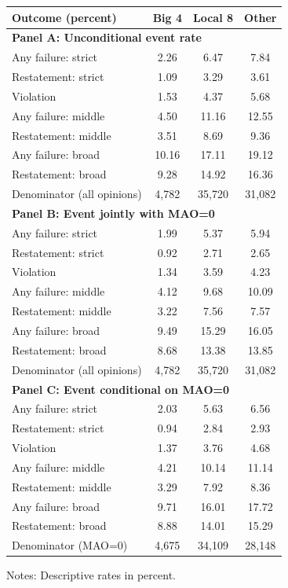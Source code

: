 \documentclass[10pt]{article}
\begin{document}
\begin{minipage}{19cm}\fontsize{10}{12}\selectfont\centering
\setlength{\tabcolsep}{4pt}\renewcommand{\arraystretch}{1.15}
\begin{tabular}{lccc}\toprule
Outcome (percent) & Big 4 & Local 8 & Other \\ \midrule
\multicolumn{4}{l}{\textbf{Panel A: Unconditional event rate}} \\
Any failure: strict & 2.26 & 6.47 & 7.84 \\
Restatement: strict & 1.09 & 3.29 & 3.61 \\
Violation & 1.53 & 4.37 & 5.68 \\
Any failure: middle & 4.50 & 11.16 & 12.55 \\
Restatement: middle & 3.51 & 8.69 & 9.36 \\
Any failure: broad & 10.16 & 17.11 & 19.12 \\
Restatement: broad & 9.28 & 14.92 & 16.36 \\
Denominator (all opinions) & 4,782 & 35,720 & 31,082 \\
\multicolumn{4}{l}{\textbf{Panel B: Event jointly with MAO=0}} \\
Any failure: strict & 1.99 & 5.37 & 5.94 \\
Restatement: strict & 0.92 & 2.71 & 2.65 \\
Violation & 1.34 & 3.59 & 4.23 \\
Any failure: middle & 4.12 & 9.68 & 10.09 \\
Restatement: middle & 3.22 & 7.56 & 7.57 \\
Any failure: broad & 9.49 & 15.29 & 16.05 \\
Restatement: broad & 8.68 & 13.38 & 13.85 \\
Denominator (all opinions) & 4,782 & 35,720 & 31,082 \\
\multicolumn{4}{l}{\textbf{Panel C: Event conditional on MAO=0}} \\
Any failure: strict & 2.03 & 5.63 & 6.56 \\
Restatement: strict & 0.94 & 2.84 & 2.93 \\
Violation & 1.37 & 3.76 & 4.68 \\
Any failure: middle & 4.21 & 10.14 & 11.14 \\
Restatement: middle & 3.29 & 7.92 & 8.36 \\
Any failure: broad & 9.71 & 16.01 & 17.72 \\
Restatement: broad & 8.88 & 14.01 & 15.29 \\
Denominator (MAO=0) & 4,675 & 34,109 & 28,148 \\
\bottomrule\end{tabular}\par\smallskip\raggedright\fontsize{9}{11}\selectfont Notes: Descriptive rates in percent.
\end{minipage}
\end{document}
